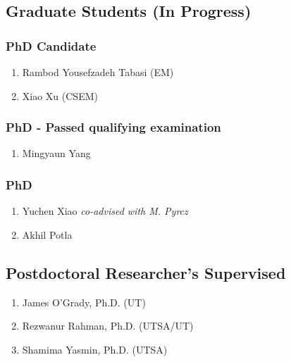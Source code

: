 \subsection*{Graduate Students (In Progress)}

\subsubsection*{PhD Candidate}
\begin{enumerate}
    \item Rambod Yousefzadeh Tabasi (EM)
    \item Xiao Xu (CSEM)
\end{enumerate}

\subsubsection*{PhD - Passed qualifying examination}
\begin{enumerate}
    \item Mingyaun Yang
\end{enumerate}

\subsubsection*{PhD}
\begin{enumerate}
    \item Yuchen Xiao \emph{co-advised with M. Pyrcz}
    \item Akhil Potla 
\end{enumerate}


\subsection*{Postdoctoral Researcher's Supervised}
  \begin{enumerate}
      \item James O'Grady, Ph.D. (UT)
      \item Rezwanur Rahman, Ph.D. (UTSA/UT)
      \item Shamima Yasmin, Ph.D. (UTSA)
  \end{enumerate}

